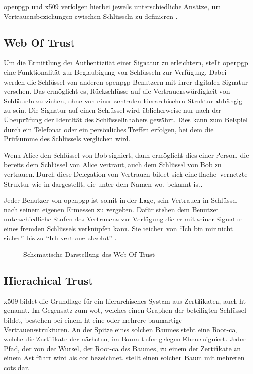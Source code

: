\gls{openpgp} und \gls{x509} verfolgen hierbei jeweils unterschiedliche Ansätze, um Vertrauensbeziehungen zwischen Schlüsseln zu definieren
\cite{krypto-pki-internet}.

\subsection{Web Of Trust}
\label{sec:GrundlagenDefinitionen:Vertrauen:WOT}
Um die Ermittlung der Authentizität einer Signatur zu erleichtern, stellt \gls{openpgp} eine Funktionalität zur Beglaubigung von Schlüsseln zur Verfügung. Dabei
werden die Schlüssel von anderen \gls{openpgp}-Benutzern mit ihrer digitalen Signatur versehen. Das ermöglicht es, Rückschlüsse auf die Vertrauenswürdigkeit
von Schlüsseln zu ziehen, ohne von einer zentralen hierarchischen Struktur abhängig zu sein. Die Signatur auf einen Schlüssel wird üblicherweise nur nach der
Überprüfung der Identität des Schlüsselinhabers gewährt. Dies kann zum Beispiel durch ein Telefonat oder ein persönliches Treffen erfolgen, bei dem die
Prüfsumme des Schlüssels verglichen wird.  

Wenn Alice den Schlüssel von Bob signiert, dann ermöglicht dies einer Person, die bereits dem Schlüssel von Alice vertraut, auch dem Schlüssel von Bob zu
vertrauen. Durch diese Delegation von Vertrauen bildet sich eine flache, vernetzte Struktur wie in  dargestellt, die unter dem Namen \gls{wot}
bekannt ist. 

Jeder Benutzer von \gls{openpgp} ist somit in der Lage, sein Vertrauen in Schlüssel nach seinem eigenen Ermessen zu vergeben. Dafür stehen dem
Benutzer unterschiedliche Stufen des Vertrauens zur Verfügung die er mit seiner Signatur eines fremden Schlüssels verknüpfen kann. Sie reichen von "`Ich bin mir
nicht sicher"' bis zu "`Ich vertraue absolut"' \cite{pgp}.

\begin{figure}
\centering

\caption{Schematische Darstellung des Web Of Trust}
\label{fig:wot}
\end{figure}

\subsection{Hierachical Trust}
\label{sec:GrundlagenDefinitionen:Vertrauen:HT}
\gls{x509} bildet die Grundlage für ein hierarchisches System aus Zertifikaten, auch \gls{ht} genannt. Im Gegensatz zum \gls{wot}, welches einen Graphen der
beteiligten Schlüssel bildet, bestehen bei einem \gls{ht} eine oder mehrere baumartige Vertrauensstrukturen.
An der Spitze eines solchen Baumes steht eine Root-\gls{ca}, welche die Zertifikate der nächsten, im Baum tiefer gelegen Ebene signiert. Jeder Pfad, der von der
Wurzel, der Root-\gls{ca} des Baumes, zu einem der Zertifikate an einem Ast führt wird als \gls{cot} bezeichnet.  stellt einen solchen Baum mit
mehreren \glspl{cot} dar.

